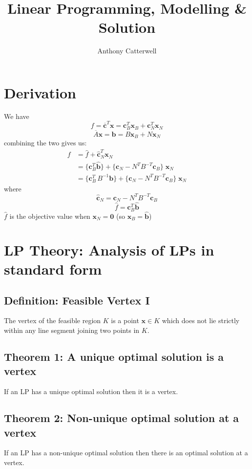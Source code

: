 \documentclass[11pt,a4paper]{article}
\title{Linear Programming, Modelling \& Solution}
\author{Anthony Catterwell}
\begin{document}
\maketitle
\break

\section*{Derivation}
We have
$$f = \overline{\textbf{c}}^{T}\textbf{x} = \textbf{c}_B^T \textbf{x}_B + \textbf{c}_N^T \textbf{x}_N$$
$$\overline{A}\textbf{x} = \textbf{b} = B\textbf{x}_B + N\textbf{x}_N$$
combining the two gives us:
\begin{align*}{}
	f &= \widehat{f} + \widehat{\textbf{c}}_N^T \textbf{x}_N \\
	  &= \{ \textbf{c}^T_B \widehat{\textbf{b}} \} +
	  \{ \textbf{c}_N - N^T B^{-T} \textbf{c}_B \} \; \textbf{x}_N \\
	  &= \{ \textbf{c}_B^T \, B^{-1}\textbf{b} \} +
	  \{ \textbf{c}_N - N^T B^{-T} \textbf{c}_B \} \; \textbf{x}_N
\end{align*}
where
$$\widehat{\textbf{c}}_N = \textbf{c}_N - N^TB^{-T}\textbf{c}_B$$
$$\widehat{f} = \textbf{c}_B^T\widehat{\textbf{b}}$$
$\widehat{f}$ is the objective value when $\textbf{x}_N = \textbf{0}$ (so $\textbf{x}_B = \widehat{\textbf{b}}$)\\


\section*{LP Theory: Analysis of LPs in standard form}
\subsection*{Definition: Feasible Vertex I}
The vertex of the feasible region $K$ is a point $\textbf{x} \in K$ which does not lie strictly within any line segment joining two points in $K$.

\subsection*{Theorem 1: A unique optimal solution is a vertex}
If an LP has a unique optimal solution then it is a vertex.

\subsection*{Theorem 2: Non-unique optimal solution at a vertex}
If an LP has a non-unique optimal solution then there is an optimal solution at a vertex.
\end{document}
